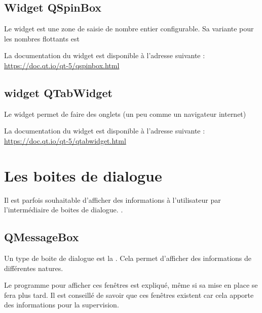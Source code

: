 {


\subsection{Widget QSpinBox}

Le widget  est une zone de saisie de nombre entier configurable.
Sa variante pour les nombres flottants est  

La documentation du widget est disponible à l'adresse suivante : \newline  \url{https://doc.qt.io/qt-5/qspinbox.html} 


\subsection{widget QTabWidget}

Le widget  permet de faire des onglets (un peu comme un navigateur internet)


La documentation du widget est disponible à l'adresse suivante : \newline  \url{https://doc.qt.io/qt-5/qtabwidget.html} 

\section{Les boites de dialogue}

Il est parfois souhaitable d'afficher des informations à l'utilisateur par l'intermédiaire de boites de dialogue. \newline.

\subsection{QMessageBox}

Un type de boite de dialogue est la . Cela permet d'afficher des informations de différentes natures.\newline

Le programme pour afficher ces fenêtres est expliqué, même si sa mise en place se fera plus tard. \newline
Il est conseillé de savoir que ces fenêtres existent car cela apporte des informations pour la supervision.\newline

}
